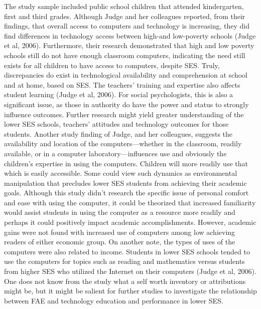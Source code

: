      The study sample included public school children that attended kindergarten, first and third grades.  Although Judge and her colleagues reported, from their findings, that overall access to computers and technology is increasing, they did find differences in technology access between high-and low-poverty schools (Judge et al, 2006).  Furthermore, their research demonstrated that high and low poverty schools still do not have enough classroom computers, indicating the need still exists for all children to have access to computers, despite SES. Truly, discrepancies do exist in technological availability and comprehension at school and at home, based on SES. The teachers’ training and expertise also affects student learning (Judge et al, 2006).  For social psychologists, this is also a significant issue, as those in authority do have the power and status to strongly influence outcomes.  Further research might yield greater understanding of the lower SES schools, teachers’ attitudes and technology outcomes for those students. Another study finding of Judge, and her colleagues, suggests the availability and location of the computers—whether in the classroom, readily available, or in a computer laboratory—influences use and obviously the children’s expertise in using the computers. Children will more readily use that which is easily accessible. Some could view such dynamics as environmental manipulation that precludes lower SES students from achieving their academic goals. Although this study didn’t research the specific issue of personal comfort and ease with using the computer, it could be theorized that increased familiarity would assist students in using the computer as a resource more readily and perhaps it could positively impact academic accomplishments. However, academic gains were not found with increased use of computers among low achieving readers of either economic group. On another note, the types of uses of the computers were also related to income. Students in lower SES schools tended to use the computers for topics such as reading and mathematics versus students from higher SES who utilized the Internet on their computers (Judge et al, 2006). One does not know from the study what a self worth inventory or attributions might be, but it might be salient for further studies to investigate the relationship between FAE and technology education and performance in lower SES. 

